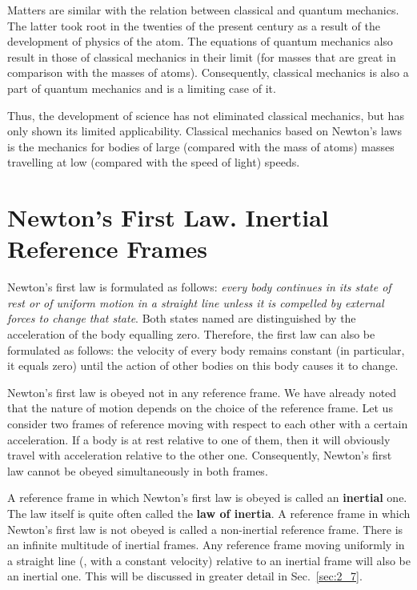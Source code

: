 Matters are similar with the relation between classical and quantum mechanics. The latter took root in the twenties of the present century as a result of the development of physics of the atom. The equations of quantum mechanics also result in those of classical mechanics in their limit (for masses that are great in comparison with the masses of atoms). Consequently, classical mechanics is also a part of quantum mechanics and is a limiting case of it.

Thus, the development of science has not eliminated classical mechanics, but has only shown its limited applicability. Classical mechanics based on Newton's laws is the mechanics for bodies of large (compared with the mass of atoms) masses travelling at low (compared with the speed of light) speeds.

\section{Newton's First Law. Inertial Reference Frames}\label{sec:2_2}

Newton's first law is formulated as follows: \textit{every body continues in its state of rest or of uniform motion in a straight line unless it is compelled by external forces to change that state}. Both states named are distinguished by the acceleration of the body equalling zero. Therefore, the first law can also be formulated as follows: the velocity of every body remains constant (in particular, it equals zero) until the action of other bodies on this body causes it to change.

Newton's first law is obeyed not in any reference frame. We have already noted that the nature of motion depends on the choice of the reference frame. Let us consider two frames of reference moving with respect to each other with a certain acceleration. If a body is at rest relative to one of them, then it will obviously travel with acceleration relative to the other one. Consequently, Newton's first law cannot be obeyed simultaneously in both frames.

A reference frame in which Newton's first law is obeyed is called an \textbf{inertial} one. The law itself is quite often called the \textbf{law of inertia}. A reference frame in which Newton's first law is not obeyed is called a non-inertial reference frame. There is an infinite multitude of inertial frames. Any reference frame moving uniformly in a straight line (\ie, with a constant velocity) relative to an inertial frame will also be an inertial one. This will be discussed in greater detail in Sec.~\ref{sec:2_7}.


